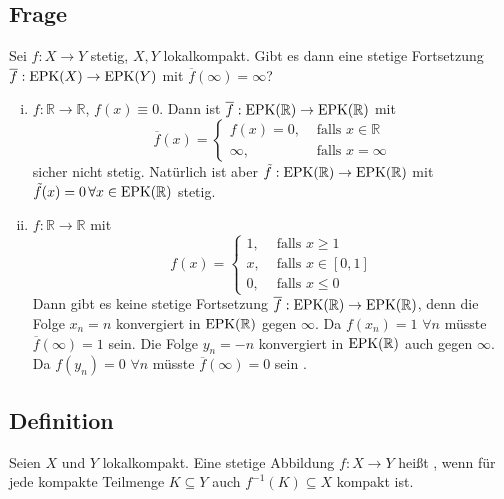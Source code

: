 \subsection[Frage nach Fortsetzungen stetiger Funktionen in der Einpunktkompaktifizierung]{Frage} %
\label{sub:58}
Sei $f : X \to Y$ stetig, $X,Y$ lokalkompakt. Gibt es dann eine stetige Fortsetzung $\overline{f} : \operatorname{EPK}(X) \to \operatorname{EPK}(Y)$ mit $\overline{f}(\infty) = \infty$?
\begin{enumerate}[(i)]
	\item $f : \mathds{R} \to \mathds{R}$, $f(x) \equiv 0$. Dann ist $\overline{f} : \operatorname{EPK}(\mathbb{R}) \to \operatorname{EPK}(\mathbb{R}) $ mit 
	\[
		\overline{f} (x) = \begin{cases}
			f(x)=0, &\text{ falls }x \in \mathds{R}\\
			\infty , &\text{ falls } x =\infty
		\end{cases}
	\]
	sicher nicht stetig. Natürlich ist aber $\tilde f : \operatorname{EPK}(\mathbb{R}) \to \operatorname{EPK}(\mathbb{R})$ mit $\tilde f (x) = 0 \,\forall x \in \operatorname{EPK}(\mathbb{R})$ stetig.
	\item $f : \mathds{R} \to \mathds{R}$ mit 
	\[
		f(x) = \begin{cases}
			1, &\text{ falls }x \ge 1\\
			x, &\text{ falls }x \in [0,1] \\
			0, &\text{ falls }x \le 0
		\end{cases}
	\]
	Dann gibt es keine stetige Fortsetzung $\overline{f} : \operatorname{EPK}(\mathbb{R}) \to\operatorname{EPK}(\mathbb{R})$, denn die Folge $x_n = n$ konvergiert in $\operatorname{EPK}(\mathbb{R})$ gegen $\infty$.
	Da $f(x_n) = 1$ $\forall n$ müsste $\overline{f} (\infty) = 1 $ sein. Die Folge $y_n = -n$ konvergiert in $\operatorname{EPK}(\mathbb{R})$ auch gegen $\infty$. Da $f(y_n) = 0$
	$\forall n$ müsste $\overline{f} (\infty) = 0 $ sein \light.
\end{enumerate}

\subsection[Definition: Eigentliche stetige Abbildung]{Definition} %
\label{sub:59}
Seien $X$ und $Y$ lokalkompakt. Eine stetige Abbildung $f : X \to Y$ heißt , wenn für jede kompakte Teilmenge 
$K \subseteq Y$ auch $f ^{-1}(K) \subseteq X$ kompakt ist.

